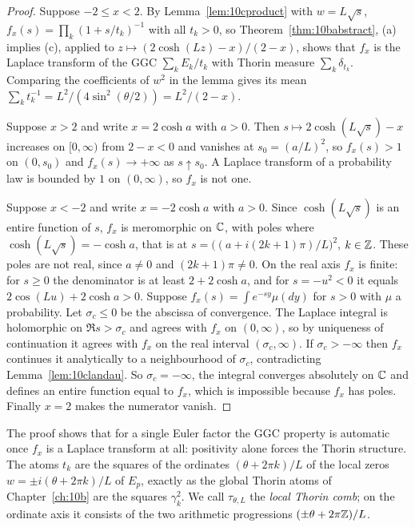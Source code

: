\begin{proof}
Suppose $-2\le x<2$. By Lemma~\ref{lem:10cproduct} with $w=L\sqrt s$, $f_x(s)=\prod_k(1+s/t_k)^{-1}$ with all $t_k>0$, so Theorem~\ref{thm:10babstract}, (a) implies (c), applied to $z\mapsto(2\cosh(Lz)-x)/(2-x)$, shows that $f_x$ is the Laplace transform of the GGC $\sum_kE_k/t_k$ with Thorin measure $\sum_k\delta_{t_k}$. Comparing the coefficients of $w^2$ in the lemma gives its mean $\sum_kt_k^{-1}=L^2/(4\sin^2(\theta/2))=L^2/(2-x)$.

Suppose $x>2$ and write $x=2\cosh a$ with $a>0$. Then $s\mapsto2\cosh(L\sqrt s)-x$ increases on $[0,\infty)$ from $2-x<0$ and vanishes at $s_0=(a/L)^2$, so $f_x(s)>1$ on $(0,s_0)$ and $f_x(s)\to+\infty$ as $s\uparrow s_0$. A Laplace transform of a probability law is bounded by $1$ on $(0,\infty)$, so $f_x$ is not one.

Suppose $x<-2$ and write $x=-2\cosh a$ with $a>0$. Since $\cosh(L\sqrt s)$ is an entire function of $s$, $f_x$ is meromorphic on $\mathbb{C}$, with poles where $\cosh(L\sqrt s)=-\cosh a$, that is at $s=\bigl((a+i(2k+1)\pi)/L\bigr)^2$, $k\in\mathbb{Z}$. These poles are not real, since $a\ne0$ and $(2k+1)\pi\ne0$. On the real axis $f_x$ is finite: for $s\ge0$ the denominator is at least $2+2\cosh a$, and for $s=-u^2<0$ it equals $2\cos(Lu)+2\cosh a>0$. Suppose $f_x(s)=\int e^{-sy}\mu(dy)$ for $s>0$ with $\mu$ a probability. Let $\sigma_c\le0$ be the abscissa of convergence. The Laplace integral is holomorphic on $\Re s>\sigma_c$ and agrees with $f_x$ on $(0,\infty)$, so by uniqueness of continuation it agrees with $f_x$ on the real interval $(\sigma_c,\infty)$. If $\sigma_c>-\infty$ then $f_x$ continues it analytically to a neighbourhood of $\sigma_c$, contradicting Lemma~\ref{lem:10clandau}. So $\sigma_c=-\infty$, the integral converges absolutely on $\mathbb{C}$ and defines an entire function equal to $f_x$, which is impossible because $f_x$ has poles. Finally $x=2$ makes the numerator vanish.
\end{proof}

The proof shows that for a single Euler factor the GGC property is automatic once $f_x$ is a Laplace transform at all: positivity alone forces the Thorin structure. The atoms $t_k$ are the squares of the ordinates $(\theta+2\pi k)/L$ of the local zeros $w=\pm i(\theta+2\pi k)/L$ of $E_p$, exactly as the global Thorin atoms of Chapter~\ref{ch:10b} are the squares $\gamma_k^2$. We call $\tau_{\theta,L}$ the \emph{local Thorin comb}; on the ordinate axis it consists of the two arithmetic progressions $(\pm\theta+2\pi\mathbb{Z})/L$.

